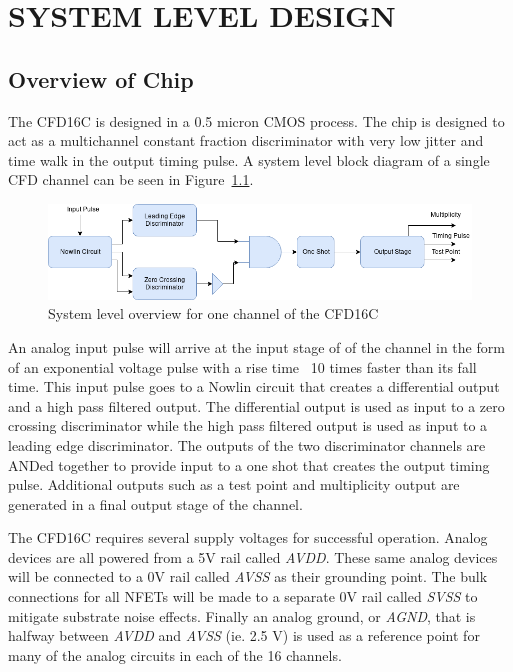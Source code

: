 \documentclass[12pt,oneside,final]{siuethesis}
\theoremstyle{definition}
\begin{document}
\chapter{SYSTEM LEVEL DESIGN}
\section{Overview of Chip}
\par The CFD16C is designed in a 0.5 micron CMOS process. The chip is designed to act as a multichannel constant fraction discriminator with very low jitter and time walk in the output timing pulse. A system level block diagram of a single CFD channel can be seen in Figure~\ref{fig:CFD}.

\begin{figure}[ht]
\centering
\includegraphics[scale=.55,keepaspectratio=true]{images/CFD.png} 
\caption{System level overview for one channel of the CFD16C}
\label{fig:CFD}
\end{figure}

\par An analog input pulse will arrive at the input stage of of the channel in the form of an exponential voltage pulse with a rise time ~10 times faster than its fall time. This input pulse goes to a Nowlin circuit that creates a differential output and a high pass filtered output. The differential output is used as input to a zero crossing discriminator while the high pass filtered output is used as input to a leading edge discriminator. The outputs of the two discriminator channels are ANDed together to provide input to a one shot that creates the output timing pulse. Additional outputs such as a test point and multiplicity output are generated in a final output stage of the channel. 

\par The CFD16C requires several supply voltages for successful operation. Analog devices are all powered from a 5V rail called \emph{AVDD}. These same analog devices will be connected to a 0V rail called \emph{AVSS} as their grounding point. The bulk connections for all NFETs will be made to a separate 0V rail called \emph{SVSS} to mitigate substrate noise effects. Finally an analog ground, or \emph{AGND}, that is halfway between \emph{AVDD} and \emph{AVSS} (ie. 2.5 V) is used as a reference point for many of the analog circuits in each of the 16 channels. 
\end{document}

